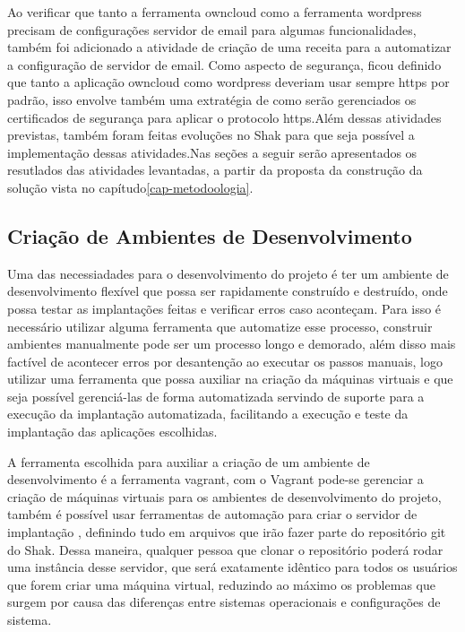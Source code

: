 Ao verificar que tanto a ferramenta owncloud como a ferramenta wordpress precisam
de configurações servidor de email para algumas funcionalidades, também foi adicionado
a atividade de criação de uma receita para a automatizar a configuração de
servidor de email. Como aspecto de segurança, ficou definido que tanto a aplicação
owncloud como wordpress deveriam usar sempre https por padrão, isso envolve também
uma extratégia de como serão gerenciados os certificados de segurança para aplicar
o protocolo https.Além dessas atividades previstas, também foram feitas evoluções
no Shak para que seja possível a implementação dessas atividades.Nas seções a
seguir serão apresentados os resutlados das atividades levantadas, a partir da
proposta da construção da solução vista no capítudo\ref{cap-metodoologia}.

\subsection{Criação de Ambientes de Desenvolvimento}

Uma das necessiadades para o desenvolvimento do projeto é ter um ambiente de desenvolvimento
flexível que possa ser rapidamente construído e destruído, onde possa testar as
implantações feitas e verificar erros caso aconteçam. Para isso é necessário utilizar
alguma ferramenta que automatize esse processo, construir ambientes manualmente pode
ser um processo longo e demorado, além disso mais factível de acontecer erros por
desantenção ao executar os passos manuais, logo utilizar uma ferramenta que possa
auxiliar na criação da máquinas virtuais e que seja possível gerenciá-las de forma
automatizada servindo de suporte para a execução da implantação automatizada, facilitando
a execução e teste da implantação das aplicações escolhidas.

A ferramenta escolhida para auxiliar a criação de um ambiente de desenvolvimento é
a ferramenta vagrant, com o Vagrant pode-se gerenciar a criação de máquinas
virtuais para os ambientes de desenvolvimento do projeto, também é possível usar
ferramentas de automação para criar o servidor de implantação , definindo tudo
em arquivos que irão fazer parte do repositório git do Shak. Dessa maneira,
qualquer pessoa que clonar o repositório poderá rodar uma instância desse servidor, que será exatamente
idêntico para todos os usuários que forem criar uma máquina virtual, reduzindo ao
máximo os problemas que surgem por causa das diferenças entre sistemas operacionais e configurações de sistema.

